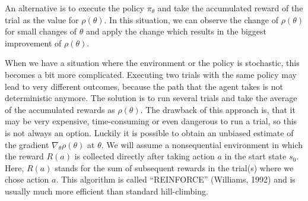 \documentclass{llncs}
\begin{document}
An alternative is to execute the policy $\pi_{\theta}$ and take the accumulated reward of the trial as the value for $\rho(\theta)$. In this situation, we can observe the change of $\rho(\theta)$ for small changes of $\theta$ and apply the change which results in the biggest improvement of $\rho(\theta)$.\par

When we have a situation where the environment or the policy is stochastic, this becomes a bit more complicated. Executing two trials with the same policy may lead to very different outcomes, because the path that the agent takes is not deterministic anymore. The solution is to run several trials and take the average of the accumulated rewards as $\rho(\theta)$. The drawback of this approach is, that it may be very expensive, time-consuming or even dangerous to run a trial, so this is not always an option.
Luckily it is possible to obtain an unbiased estimate of the gradient $\nabla_{\theta}\rho(\theta)$ at $\theta$. We will assume a nonsequential environment in which the reward $R(a)$ is collected directly after taking action $a$ in the start state $s_0$. Here, $R(a)$ stands for the sum of subsequent rewards in the trial(s) where we chose action $a$. This algorithm is called ``REINFORCE'' (Williams, 1992)\cite{Williams1992} and is usually much more efficient than standard hill-climbing.
\end{document}
